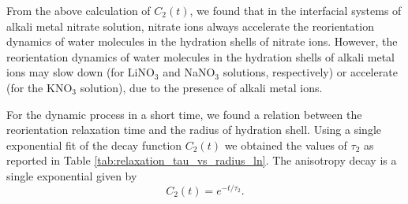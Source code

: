 From the above calculation of $C_2(t)$, we found that in the interfacial systems of alkali metal nitrate solution, 
nitrate ions always accelerate the reorientation dynamics of water molecules in the hydration shells of nitrate ions.
However, the reorientation dynamics of water molecules in the hydration shells of alkali metal ions may slow down 
(for LiNO$_3$ and NaNO$_3$ solutions, respectively) or accelerate (for the KNO$_3$ solution), 
due to the presence of alkali metal ions. 

For the dynamic process in a short time, we found a relation between the reorientation relaxation time and the radius of hydration shell.
Using a single exponential fit of the decay function $C_2(t)$ we obtained the values of $\tau_2$ as reported in Table \ref{tab:relaxation_tau_vs_radius_ln}. 
The anisotropy decay is a single exponential given by 
\begin{equation}
C_2(t)=e^{-t/\tau_2}\nonumber.
\label{eq:tcf2}
\end{equation}
